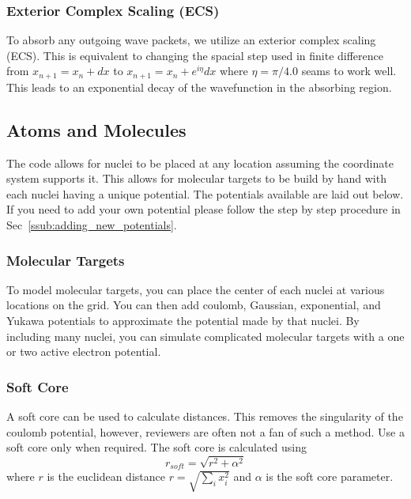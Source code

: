 \documentclass{article}
\begin{document}
\subsubsection{Exterior Complex Scaling (ECS)} %
\label{ssub:exterer_complex_scaling}
To absorb any outgoing wave packets, we utilize an exterior complex scaling (ECS). This is equivalent to changing the spacial step used in finite difference from $x_{n+1} = x_n+dx$ to $x_{n+1} = x_n+e^{i\eta}dx$ where $\eta=\pi / 4.0$ seams to work well. This leads to an exponential decay of the wavefunction in the absorbing region.


\subsection{Atoms and Molecules} %
\label{sub:atoms_and_molecules}
The code allows for nuclei to be placed at any location assuming the coordinate system supports it. This allows for molecular targets to be build by hand with each nuclei having a unique potential. The potentials available are laid out below. If you need to add your own potential please follow the step by step procedure in Sec~\ref{ssub:adding_new_potentials}.

\subsubsection{Molecular Targets} %
\label{ssub:molecular_targets}
To model molecular targets, you can place the center of each nuclei at various locations on the grid. You can then add coulomb, Gaussian, exponential, and Yukawa potentials to approximate the potential made by that nuclei. By including many nuclei, you can simulate complicated molecular targets with a one or two active electron potential.

\subsubsection{Soft Core} %
\label{ssub:soft_core_like}
A soft core can be used to calculate distances. This removes the singularity of the coulomb potential, however, reviewers are often not a fan of such a method. Use a soft core only when required. The soft core is calculated using
\begin{equation}
  r_{soft} = \sqrt{r^2 + \alpha^2}
  \label{eq:soft_core}
\end{equation}
where $r$ is the euclidean distance $r=\sqrt{\sum\limits_i x_i^2}$ and $\alpha$ is the soft core parameter.
\end{document}
